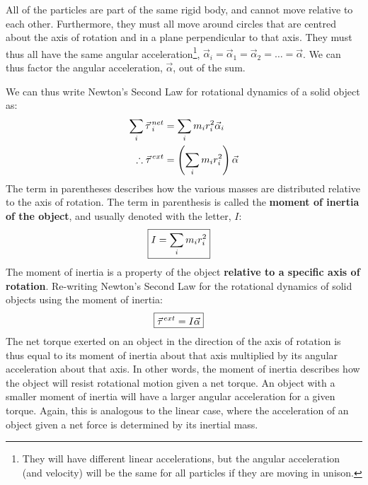 All of the particles are part of the same rigid body, and cannot move relative to each other. Furthermore, they must all move around circles that are centred about the axis of rotation and in a plane perpendicular to that axis. They must thus all have the same angular acceleration\footnote{They will have different linear accelerations, but the angular acceleration (and velocity) will be the same for all particles if they are moving in unison.}, $\vec\alpha_i = \vec \alpha_1 = \vec \alpha_2 =\dots=\vec\alpha$. We can thus factor the angular acceleration, $\vec \alpha$, out of the sum.

We can thus write Newton's Second Law for rotational dynamics of a solid object as:
\begin{align*}
\sum_i \pvec\tau_i^{net} &= \sum_i  m_ir_i^2\vec\alpha_i\\
\therefore \pvec\tau^{ext}&= \left(\sum_i  m_ir_i^2\right)\vec\alpha
\end{align*}
The term in parentheses describes how the various masses are distributed relative to the axis of rotation. The term in parenthesis is called the \textbf{moment of inertia of the object}, and usually denoted with the letter, $I$:
\begin{align}
\Aboxed{I = \sum_i  m_ir_i^2}
\end{align}
The moment of inertia is a property of the object \textbf{relative to a specific axis of rotation}. Re-writing Newton's Second Law for the rotational dynamics of solid objects using the moment of inertia:
\begin{align}
\Aboxed{\pvec\tau^{ext}&= I\vec\alpha}
\end{align}
The net torque exerted on an object in the direction of the axis of rotation is thus equal to its moment of inertia about that axis multiplied by its angular acceleration about that axis. In other words, the moment of inertia describes how the object will resist rotational motion given a net torque. An object with a smaller moment of inertia will have a larger angular acceleration for a given torque. Again, this is analogous to the linear case, where the acceleration of an object given a net force is determined by its inertial mass.
